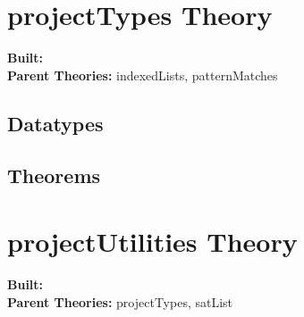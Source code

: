 \documentclass[11pt, twoside]{article}
\begin{document}






\tableofcontents
\cleardoublepage
\HOLpagestyle

\section{projectTypes Theory}
\begin{flushleft}
\textbf{Built:} \HOLprojectTypesDate \\[2pt]
\textbf{Parent Theories:} indexedLists, patternMatches
\end{flushleft}

\subsection{Datatypes}

\HOLprojectTypesDatatypes


\subsection{Theorems}

\HOLprojectTypesTheorems

\section{projectUtilities Theory}
\begin{flushleft}
\textbf{Built:} \HOLprojectUtilitiesDate \\[2pt]
\textbf{Parent Theories:} projectTypes, satList
\end{flushleft}


\end{document}
